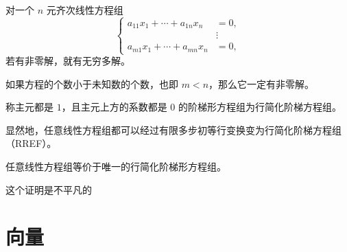 对一个 $n$ 元齐次线性方程组
\[
\left\{
\begin{aligned}
	a_{11}x_1+\cdots+a_{1n}x_n&=0,\\
	&\vdots\\
	a_{m1}x_1+\cdots+a_{mn}x_n&=0,
\end{aligned}
\right.
\]
若有非零解，就有无穷多解。

如果方程的个数小于未知数的个数，也即 $m<n$，那么它一定有非零解。

\begin{definition}\label{p1:concept:c2-l206}
	称主元都是 $1$，且主元上方的系数都是 $0$ 的阶梯形方程组为行简化阶梯方程组。
	
	显然地，任意线性方程组都可以经过有限多步初等行变换变为行简化阶梯方程组（RREF）。
\end{definition}

\begin{proposition}
	任意线性方程组等价于唯一的行简化阶梯形方程组。
\end{proposition}
这个证明是不平凡的




\section{向量}

